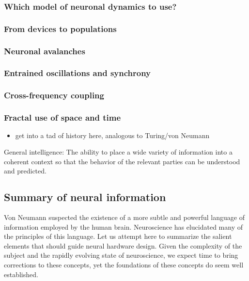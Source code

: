 \documentclass[twocolumn]{article}
\begin{document}
\subsubsection{Which model of neuronal dynamics to use?}

\subsubsection{From devices to populations}

\subsubsection{Neuronal avalanches}

\subsubsection{Entrained oscillations and synchrony}

\subsubsection{Cross-frequency coupling}

\subsubsection{Fractal use of space and time}


\begin{itemize}
\item get into a tad of history here, analogous to Turing/von Neumann
\end{itemize}

General intelligence: The ability to place a wide variety of information into a coherent context so that the behavior of the relevant parties can be understood and predicted.

\subsection{Summary of neural information}
Von Neumann suspected the existence of a more subtle and powerful language of information employed by the human brain. Neuroscience has elucidated many of the principles of this language. Let us attempt here to summarize the salient elements that should guide neural hardware design. Given the complexity of the subject and the rapidly evolving state of neuroscience, we expect time to bring corrections to these concepts, yet the foundations of these concepts do seem well established.
\end{document}
